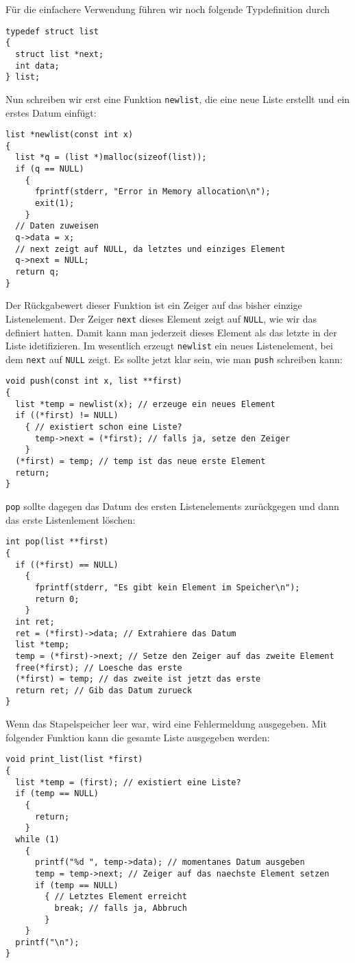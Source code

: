 Für die einfachere Verwendung führen wir noch folgende Typdefinition durch
\begin{lstlisting}
typedef struct list
{
  struct list *next;
  int data;
} list;
\end{lstlisting}
Nun schreiben wir erst eine Funktion \verb|newlist|, die eine neue Liste erstellt und ein erstes Datum einfügt:
\begin{lstlisting}
list *newlist(const int x)
{
  list *q = (list *)malloc(sizeof(list));
  if (q == NULL)
    {
      fprintf(stderr, "Error in Memory allocation\n");
      exit(1);
    }
  // Daten zuweisen
  q->data = x;
  // next zeigt auf NULL, da letztes und einziges Element
  q->next = NULL;
  return q;
}
\end{lstlisting}
Der Rückgabewert dieser Funktion ist ein Zeiger auf das bisher einzige Listenelement.
Der Zeiger \verb|next| dieses Element zeigt auf \verb|NULL|, wie wir das definiert hatten.
Damit kann man jederzeit dieses Element als das letzte in der Liste idetifizieren.
Im wesentlich erzeugt \verb|newlist| ein neues Listenelement, bei dem \verb|next| auf \verb|NULL| zeigt.
Es sollte jetzt klar sein, wie man \verb|push| schreiben kann:
\begin{lstlisting}
void push(const int x, list **first)
{
  list *temp = newlist(x); // erzeuge ein neues Element
  if ((*first) != NULL)
    { // existiert schon eine Liste?
      temp->next = (*first); // falls ja, setze den Zeiger
    }
  (*first) = temp; // temp ist das neue erste Element
  return;
}
\end{lstlisting}
\verb|pop| sollte dagegen das Datum des ersten Listenelements zurückgegen und dann das erste Listenlement löschen:
\begin{lstlisting}
int pop(list **first)
{
  if ((*first) == NULL)
    {
      fprintf(stderr, "Es gibt kein Element im Speicher\n");
      return 0;
    }
  int ret;
  ret = (*first)->data; // Extrahiere das Datum
  list *temp;
  temp = (*first)->next; // Setze den Zeiger auf das zweite Element
  free(*first); // Loesche das erste
  (*first) = temp; // das zweite ist jetzt das erste
  return ret; // Gib das Datum zurueck
}
\end{lstlisting}
Wenn das Stapelspeicher leer war, wird eine Fehlermeldung ausgegeben.
Mit folgender Funktion kann die gesamte Liste ausgegeben werden:
\begin{lstlisting}
void print_list(list *first)
{
  list *temp = (first); // existiert eine Liste?
  if (temp == NULL)
    {
      return;
    }
  while (1)
    {
      printf("%d ", temp->data); // momentanes Datum ausgeben
      temp = temp->next; // Zeiger auf das naechste Element setzen
      if (temp == NULL)
        { // Letztes Element erreicht
          break; // falls ja, Abbruch
        }
    }
  printf("\n");
}
\end{lstlisting}
